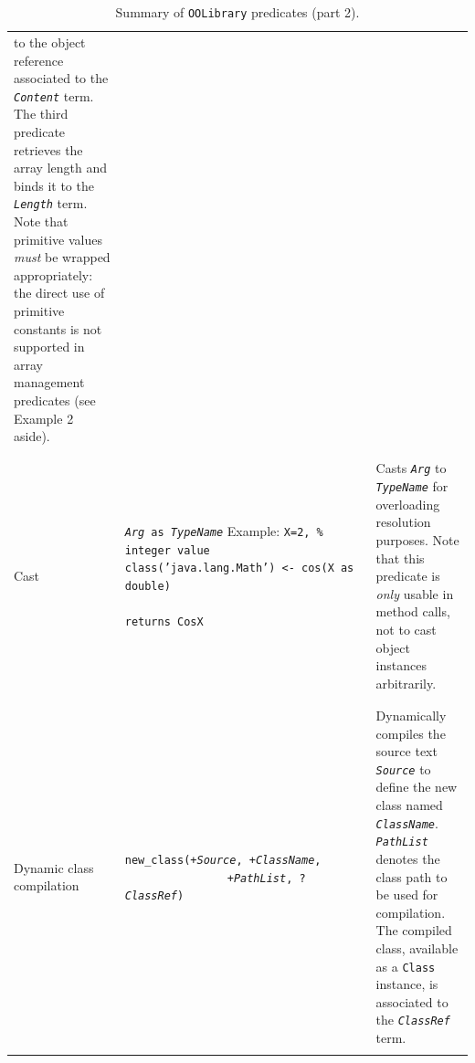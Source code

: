 \begin{table}
\begin{center}
{\begin{tabular}{p{2.3cm}p{6.6cm}p{4.6cm}}
    to the object reference associated to the \texttt{\textit{Content}} term.
    \newline
    The third predicate retrieves the array length and binds it to the
    \textit{\texttt{Length}} term.\newline
    Note that primitive values \textit{must} be wrapped appropriately:
    the direct use of primitive constants is not supported in array management
    predicates (see Example 2 aside).
    \\\\\hline\\
    Cast
    &
    \texttt{\textit{Arg} as \textit{TypeName}}\newline
    Example:\newline
    \texttt{X=2, \% integer value}\newline
    \texttt{class('java.lang.Math') <- cos(X as double)}\newline
    \mbox{~~~~~~~~~~~~~~~~~~~~~~~~~~~~~~~~~~~~}\texttt{ returns CosX}%
    &
    Casts \texttt{\textit{Arg}} to \texttt{\textit{TypeName}} for overloading
    resolution purposes. Note that this predicate is \textit{only} usable in
    method calls, not to cast object instances arbitrarily.
    \\\\\hline\\
    Dynamic class \newline compilation
    &
    \texttt{new\_class(+\textit{Source}, +\textit{ClassName},}\newline
    \mbox{~~~~~~~~~~~~~~~~}\texttt{+\textit{PathList}, ?\textit{ClassRef})}\newline
    &
    Dynamically compiles the source text \texttt{\textit{Source}}
    to define the new class named \texttt{\textit{ClassName}}.
    \texttt{\textit{PathList}} denotes the class path to be used
    for compilation.
    The compiled class, available as a \texttt{Class} instance,
    is associated to the \texttt{\textit{ClassRef}} term.
    \\
    \\
    \hline\hline
    \end{tabular}
    }\end{center}
    \caption{Summary of \texttt{OOLibrary} predicates (part 2).}
    \label{tab:summary-of-javalibrary-predicates2}
\end{table}


